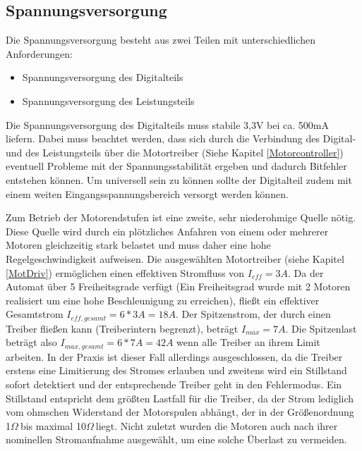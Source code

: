 \documentclass{scrartcl}
\newcommand {\Ohm} {$\Omega\ $}
\begin{document}
\newpage

 
\subsection{Spannungsversorgung}
Die Spannungsversorgung besteht aus zwei Teilen mit unterschiedlichen Anforderungen:
\begin{itemize}
\item{Spannungsversorgung des Digitalteils}
\item{Spannungsversorgung des Leistungsteils}
\end{itemize}
Die Spannungsversorgung des Digitalteils muss stabile 3,3V bei ca. 500mA liefern. Dabei muss beachtet werden, dass sich durch die Verbindung des Digital- und des Leistungsteils über die Motortreiber (Siehe Kapitel \ref{Motorcontroller}) eventuell Probleme mit der Spannungsstabilität ergeben und dadurch Bitfehler entstehen können. Um universell sein zu können sollte der Digitalteil zudem mit einem weiten Eingangsspannungsbereich versorgt werden können.  \newline

Zum Betrieb der Motorendstufen ist eine zweite, sehr niederohmige Quelle nötig. Diese Quelle wird durch ein plötzliches Anfahren von einem oder mehrerer Motoren gleichzeitig stark belastet und muss daher eine hohe Regelgeschwindigkeit aufweisen. Die ausgewählten Motortreiber (siehe Kapitel \ref{MotDriv}) ermöglichen einen effektiven Stromfluss von $I_{eff} = 3A$. Da der Automat über 5 Freiheitsgrade verfügt (Ein Freiheitsgrad wurde mit 2 Motoren realisiert um eine hohe Beschleunigung zu erreichen), fließt ein effektiver Gesamtstrom $I_{eff,gesamt} = 6*3A = 18A$. Der Spitzenstrom, der durch einen Treiber fließen kann (Treiberintern begrenzt), beträgt $I_{max} = 7A$. Die Spitzenlast beträgt also $I_{max,gesamt} = 6*7A = 42A$ wenn alle Treiber an ihrem Limit arbeiten. In der Praxis ist dieser Fall allerdings ausgeschlossen, da die Treiber erstens eine Limitierung des Stromes erlauben und zweitens wird ein Stillstand sofort detektiert und der entsprechende Treiber geht in den Fehlermodus. Ein Stillstand entspricht dem größten Lastfall für die Treiber, da der Strom lediglich vom ohmschen Widerstand der Motorspulen abhängt, der in der Größenordnung 1\Ohm bis maximal 10\Ohm liegt. Nicht zuletzt wurden die Motoren auch nach ihrer nominellen Stromaufnahme ausgewählt, um eine solche Überlast zu vermeiden. \newline
\end{document}
